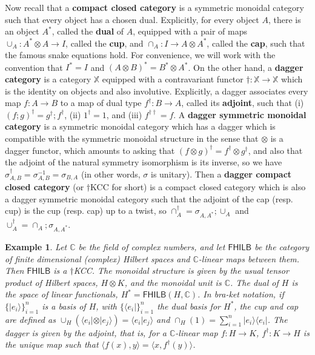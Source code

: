 \documentclass[submission,copyright,creativecommons]{eptcs}
\newtheorem{example}[observation]{Example}
\begin{document}
Now recall that a \textbf{compact closed category} \cite[Sec 4.8]{selinger2010survey} is a symmetric monoidal category such that every object has a chosen dual. Explicitly, for every object $A$, there is an object $A^\ast$, called the \textbf{dual} of $A$, equipped with a pair of maps $\cup_A: A^\ast \otimes A \to I$, called the \textbf{cup}, and $\cap_A: I \to A \otimes A^\ast$, called the \textbf{cap}, such that the famous snake equations hold. For convenience, we will work with the convention that $I^\ast = I$ and $(A \otimes B)^\ast = B^\ast \otimes A^\ast$. On the other hand, a \textbf{dagger category} \cite[Sec 7]{selinger2010survey} is a category $\mathbb{X}$ equipped with a contravariant functor $\dagger: \mathbb{X} \to \mathbb{X}$ which is the identity on objects and also involutive. Explicitly, a dagger associates every map $f: A \to B$ to a map of dual type $f^\dagger: B \to A$, called its \textbf{adjoint}, such that (i) $(f;g)^\dagger= g^\dagger; f^\dagger$, (ii) $1^\dagger = 1$, and (iii) $f^{\dagger \dagger} = f$. A \textbf{dagger symmetric monoidal category} \cite[Sec 7.2]{selinger2010survey} is a symmetric monoidal category which has a dagger which is compatible with the symmetric monoidal structure in the sense that $\otimes$ is a dagger functor, which amounts to asking that $(f \otimes g)^\dagger = f^\dagger \otimes g^\dagger$, and also that the adjoint of the natural symmetry isomorphism is its inverse, so we have $\sigma_{A,B}^\dagger = \sigma^{-1}_{A,B} = \sigma_{B,A}$ (in other words, $\sigma$ is unitary). Then a \textbf{dagger compact closed category} \cite[Sec 7.4]{selinger2010survey} (or $\dagger$KCC for short) is a compact closed category which is also a dagger symmetric monoidal category such that the adjoint of the cap (resp. cup) is the cup (resp. cap) up to a twist, so $\cap_A^\dagger =  \sigma_{A,A^\ast}; \cup_A$ and $\cup_A^\dagger = \cap_A; \sigma_{A, A^\ast}$.

\begin{example} Let $\mathbb{C}$ be the field of complex numbers, and let $\mathsf{FHILB}$ be the category of finite dimensional (complex) Hilbert spaces and $\mathbb{C}$-linear maps between them. Then $\mathsf{FHILB}$ is a $\dagger$KCC. The monoidal structure is given by the usual tensor product of Hilbert spaces, $H \otimes K$, and the monoidal unit is $\mathbb{C}$. The dual of $H$ is the space of linear functionals, $H^\ast = \mathsf{FHILB}(H, \mathbb{C})$. In bra-ket notation, if $\lbrace \vert e_i \rangle \rbrace^n_{i=1}$ is a basis of $H$, with $\lbrace \langle e_i \vert \rbrace^n_{i=1}$ the dual basis for $H^\ast$, the cup and cap are defined as $\cup_H\left(\langle e_i \vert \otimes \vert e_j \rangle \right) = \langle e_i \vert e_j \rangle$ and $\cap_H(1) = \sum^n_{i=1} \vert e_i \rangle\langle e_i \vert$. The dagger is given by the adjoint, that is, for a $\mathbb{C}$-linear map $f: H \to K$, $f^\dagger: K \to H$ is the unique map such that $\langle f(x), y \rangle = \langle x, f^\dagger(y)\rangle$. %
\end{example}
\end{document}
